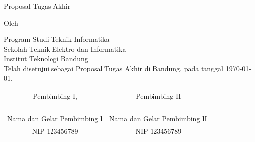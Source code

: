 
\clearpage
\pagestyle{empty}

\begin{center}
\smallskip

    \Large \bfseries \MakeUppercase{\thetitle}
    \vfill

    \Large Proposal Tugas Akhir
    \vfill

    \large Oleh

    \Large \theauthor

    \large Program Studi Teknik Informatika \\
    Sekolah Teknik Elektro dan Informatika \\
    Institut Teknologi Bandung \\

    \vfill
    \normalsize \normalfont
    Telah disetujui sebagai Proposal Tugas Akhir di Bandung, pada tanggal \today.

    \vfill
    \setlength{\tabcolsep}{12pt}
    \begin{tabular}{c@{\hskip 0.5in}c}
        Pembimbing I, & Pembimbing II \\
        & \\
        & \\
        & \\
        & \\
        Nama dan Gelar Pembimbing I & Nama dan Gelar Pembimbing II \\
        NIP 123456789 & NIP 123456789 \\
    \end{tabular}

\end{center}
\clearpage
